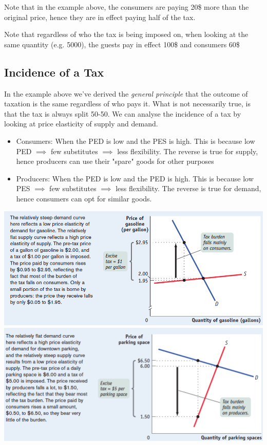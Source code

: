 \documentclass[english,course]{Notes}
\newcommand{\ita}[1]{\textit{#1}}
\begin{document}
\par{Note that in the example above, the consumers are paying 20\$ more than the original price, hence they are in effect paying half of the tax.}


\par{Note that regardless of who the tax is being imposed on, when looking at the same quantity (e.g. 5000), the guests pay in effect 100\$ and consumers 60\$}

\subsection{Incidence of a Tax}

\par{In the example above we've derived the \ita{general principle} that the outcome of taxation is the same regardless of who pays it. What is not necessarily true, is that the tax is always split 50-50. We can analyse the incidence of a tax by looking at price elasticity of supply and demand.}

\begin{itemize}
	\item[] Consumers: When the PED is low and the PES is high. This is because low PED $\implies$ few substitutes $\implies$ less flexibility. The reverse is true for supply, hence producers can use their "spare" goods for other purposes
	\item[] Producers: When the PED is low and the PED is high. This is because low PES $\implies$ few substitutes $\implies$ less flexibility. The reverse is true for demand, hence consumers can opt for similar goods.
\end{itemize}

\includegraphics[width=\textwidth]{tax2} 
\includegraphics[width=\textwidth]{tax3} 
\end{document}
